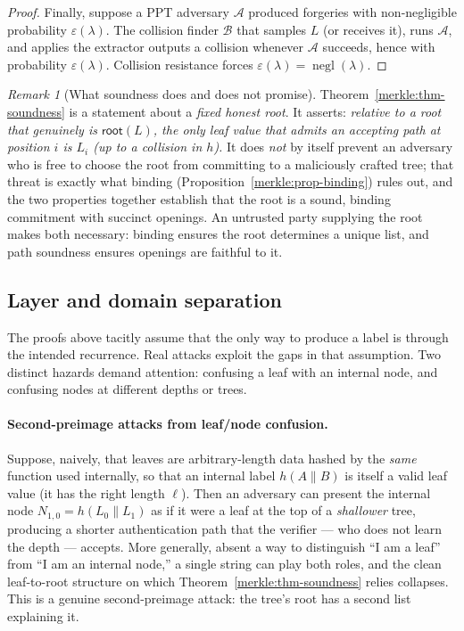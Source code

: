 \documentclass[11pt,a4paper]{article}
\theoremstyle{definition}
\theoremstyle{remark}
\newtheorem{remark}[theorem]{Remark}
\DeclareMathOperator{\negl}{negl}
\begin{document}
\begin{proof}
Finally, suppose a PPT adversary \(\mathcal{A}\) produced forgeries with non-negligible probability \(\varepsilon(\lambda)\). The collision finder \(\mathcal{B}\) that samples \(L\) (or receives it), runs \(\mathcal{A}\), and applies the extractor outputs a collision whenever \(\mathcal{A}\) succeeds, hence with probability \(\varepsilon(\lambda)\). Collision resistance forces \(\varepsilon(\lambda) = \negl(\lambda)\).
\end{proof}

\begin{remark}[What soundness does and does not promise]\label{merkle:rem-soundness-scope}
Theorem~\ref{merkle:thm-soundness} is a statement about a \emph{fixed honest root}. It asserts: \emph{relative to a root that genuinely is \(\mathsf{root}(L)\), the only leaf value that admits an accepting path at position \(i\) is \(L_i\) (up to a collision in \(h\)).} It does \emph{not} by itself prevent an adversary who is free to choose the root from committing to a maliciously crafted tree; that threat is exactly what binding (Proposition~\ref{merkle:prop-binding}) rules out, and the two properties together establish that the root is a sound, binding commitment with succinct openings. An untrusted party supplying the root makes both necessary: binding ensures the root determines a unique list, and path soundness ensures openings are faithful to it.
\end{remark}

\subsection{Layer and domain separation}\label{merkle:sec-domain}

The proofs above tacitly assume that the only way to produce a label is through the intended recurrence. Real attacks exploit the gaps in that assumption. Two distinct hazards demand attention: confusing a leaf with an internal node, and confusing nodes at different depths or trees.

\paragraph{Second-preimage attacks from leaf/node confusion.}
Suppose, naively, that leaves are arbitrary-length data hashed by the \emph{same} function used internally, so that an internal label \(h(A\|B)\) is itself a valid leaf value (it has the right length \(\ell\)). Then an adversary can present the internal node \(N_{1,0} = h(L_0\|L_1)\) as if it were a leaf at the top of a \emph{shallower} tree, producing a shorter authentication path that the verifier --- who does not learn the depth --- accepts. More generally, absent a way to distinguish ``I am a leaf'' from ``I am an internal node,'' a single string can play both roles, and the clean leaf-to-root structure on which Theorem~\ref{merkle:thm-soundness} relies collapses. This is a genuine second-preimage attack: the tree's root has a second list explaining it.
\end{document}
